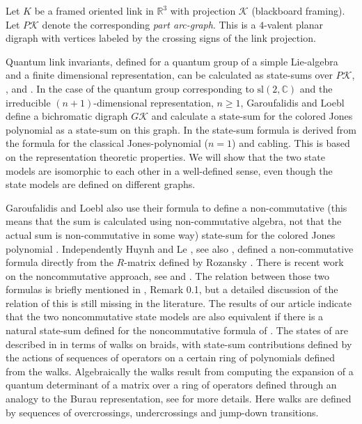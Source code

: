 \documentclass[11pt]{article}
\theoremstyle{definition}
\theoremstyle{remark}
\theoremstyle{remark}
\begin{document}
Let $K$ be a framed oriented link in $\mathbb{R}^3$ with projection $\mathcal{K}$ (blackboard framing). 
Let $P\mathcal{K}$ denote the corresponding \textit{part arc-graph}. This is a $4$-valent planar digraph with vertices labeled by the crossing signs of the link projection.

Quantum link invariants, defined for a quantum group of a simple Lie-algebra and a finite dimensional representation, can be calculated as state-sums over $P\mathcal{K}$, \cite{J}, \cite{RT} and \cite{KiM}. In the case of the quantum group corresponding to $\textrm{sl}(2,\mathbb{C})$ and the irreducible $(n+1)$-dimensional representation, $n\geq 1$, Garoufalidis and Loebl \cite{GL} define a bichromatic digraph $G\mathcal{K}$ and calculate a state-sum for the colored Jones polynomial as a state-sum on this graph. In \cite{GL} the state-sum formula is derived from the formula for the classical Jones-polynomial ($n=1$) and cabling. This is based on the representation theoretic properties. We will show that the two state models are isomorphic to each other in a well-defined sense, even though the state models are defined on different graphs. 

Garoufalidis and Loebl also use their formula to define a non-commutative (this means that the sum is calculated using non-commutative algebra, not that the actual sum is non-commutative in some way) state-sum for the colored Jones polynomial \cite{GL}. Independently Huynh and Le \cite{HL}, see also \cite{A}, defined a non-commutative formula directly from the $R$-matrix defined by Rozansky \cite{R}. There is recent work on the noncommutative approach, see \cite{B} and \cite{H}. 
The relation between those two formulas is briefly mentioned in \cite{HL}, Remark 0.1, but a detailed discussion of the relation of this is still missing in the literature. The results of our article indicate that the two noncommutative state models are also equivalent if there is a natural state-sum defined for the noncommutative formula of \cite{GL}.
The states of \cite{HL} are described in \cite{A} in terms of walks on braids, with state-sum contributions defined by the actions of sequences of operators on a certain ring of polynomials defined from the walks. Algebraically the walks result from computing the expansion of a quantum determinant of a matrix over a ring of operators defined through an analogy to the Burau representation, see \cite{A} for more details. Here walks are defined by sequences of overcrossings, undercrossings and jump-down transitions. 
\end{document}
